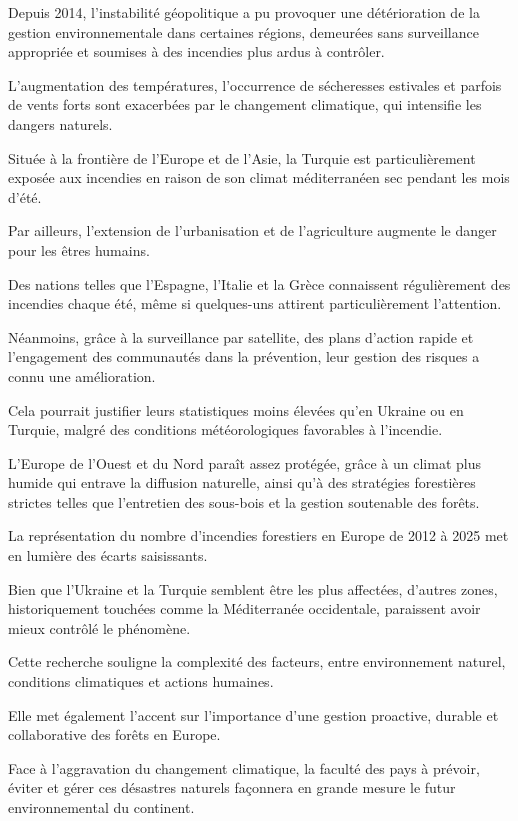\documentclass[
]{article}
\begin{document}
Depuis 2014, l'instabilité géopolitique a pu provoquer une détérioration
de la gestion environnementale dans certaines régions, demeurées sans
surveillance appropriée et soumises à des incendies plus ardus à
contrôler.

L'augmentation des températures, l'occurrence de sécheresses estivales
et parfois de vents forts sont exacerbées par le changement climatique,
qui intensifie les dangers naturels.

Située à la frontière de l'Europe et de l'Asie, la Turquie est
particulièrement exposée aux incendies en raison de son climat
méditerranéen sec pendant les mois d'été.

Par ailleurs, l'extension de l'urbanisation et de l'agriculture augmente
le danger pour les êtres humains.

Des nations telles que l'Espagne, l'Italie et la Grèce connaissent
régulièrement des incendies chaque été, même si quelques-uns attirent
particulièrement l'attention.

Néanmoins, grâce à la surveillance par satellite, des plans d'action
rapide et l'engagement des communautés dans la prévention, leur gestion
des risques a connu une amélioration.

Cela pourrait justifier leurs statistiques moins élevées qu'en Ukraine
ou en Turquie, malgré des conditions météorologiques favorables à
l'incendie.

L'Europe de l'Ouest et du Nord paraît assez protégée, grâce à un climat
plus humide qui entrave la diffusion naturelle, ainsi qu'à des
stratégies forestières strictes telles que l'entretien des sous-bois et
la gestion soutenable des forêts.

La représentation du nombre d'incendies forestiers en Europe de 2012 à
2025 met en lumière des écarts saisissants.

Bien que l'Ukraine et la Turquie semblent être les plus affectées,
d'autres zones, historiquement touchées comme la Méditerranée
occidentale, paraissent avoir mieux contrôlé le phénomène.

Cette recherche souligne la complexité des facteurs, entre environnement
naturel, conditions climatiques et actions humaines.

Elle met également l'accent sur l'importance d'une gestion proactive,
durable et collaborative des forêts en Europe.

Face à l'aggravation du changement climatique, la faculté des pays à
prévoir, éviter et gérer ces désastres naturels façonnera en grande
mesure le futur environnemental du continent.
\end{document}
